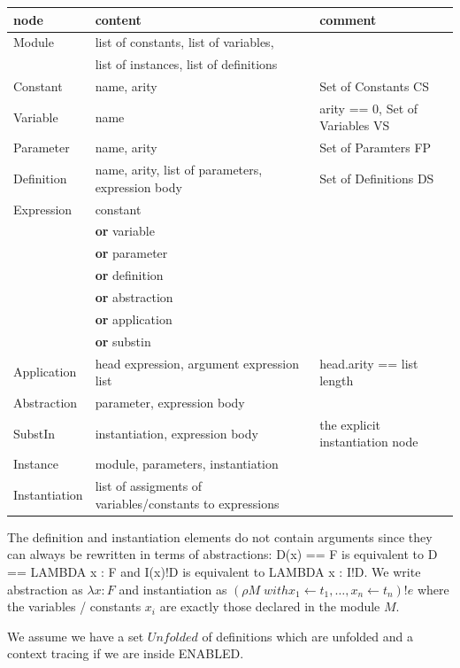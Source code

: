\documentclass[a4paper]{article}
\newcommand{\dor}{\textbf{or}}
\begin{document}
\begin{tabular}{lll}
node & content & comment \\
\hline
Module & list of constants, list of variables, & \\
       & list of instances, list of definitions & \\
Constant  & name, arity & Set of Constants CS \\
Variable  & name & arity == 0, Set of Variables VS \\
Parameter & name, arity & Set of Paramters FP \\
Definition & name, arity, list of parameters, expression body & Set of Definitions DS\\
Expression  & constant & \\
          & \dor{} variable & \\
          & \dor{} parameter & \\
          & \dor{} definition & \\
          & \dor{} abstraction &\\
          & \dor{} application &\\
          & \dor{} substin & \\
Application & head expression, argument expression list & head.arity == list length\\
Abstraction & parameter, expression body & \\
SubstIn     & instantiation, expression body & the explicit instantiation node \\
Instance & module, parameters, instantiation & \\
Instantiation & list of assigments of variables/constants to expressions& \\
\end{tabular}

The definition and instantiation elements do not contain arguments since they
 can always be rewritten in terms of abstractions: D(x) == F is equivalent to
 D == LAMBDA x : F and I(x)!D is equivalent to LAMBDA x : I!D. We write
 abstraction as $\lambda x : F$ and instantiation as $(\rho M\; with x_1
 \leftarrow t_1,\ldots,x_n \leftarrow t_n)!e$ where the variables / constants
 $x_i$ are exactly those declared in the module $M$.

We assume we have a set $Unfolded$ of definitions which are unfolded and
 a context tracing if we are inside ENABLED.
\end{document}
